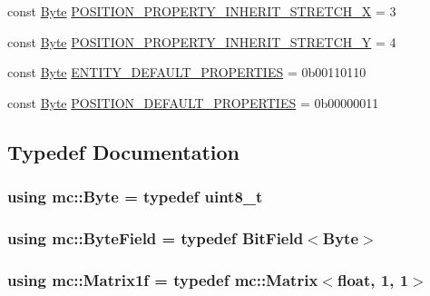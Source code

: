 \begin{DoxyCompactItemize}
\item 
const \hyperlink{namespacemc_a64bc4fa1f43bc4da5c7ac98c04c863e8}{Byte} \hyperlink{namespacemc_a1ddeace50be9bf89c37a08de87213e85}{P\+O\+S\+I\+T\+I\+O\+N\+\_\+\+P\+R\+O\+P\+E\+R\+T\+Y\+\_\+\+I\+N\+H\+E\+R\+I\+T\+\_\+\+S\+T\+R\+E\+T\+C\+H\+\_\+X} = 3
\item 
const \hyperlink{namespacemc_a64bc4fa1f43bc4da5c7ac98c04c863e8}{Byte} \hyperlink{namespacemc_a29d2f6b06f29e315be17e977d9a7eabb}{P\+O\+S\+I\+T\+I\+O\+N\+\_\+\+P\+R\+O\+P\+E\+R\+T\+Y\+\_\+\+I\+N\+H\+E\+R\+I\+T\+\_\+\+S\+T\+R\+E\+T\+C\+H\+\_\+Y} = 4
\item 
const \hyperlink{namespacemc_a64bc4fa1f43bc4da5c7ac98c04c863e8}{Byte} \hyperlink{namespacemc_aad93bda8c11c45721d4d2feb348f9d5f}{E\+N\+T\+I\+T\+Y\+\_\+\+D\+E\+F\+A\+U\+L\+T\+\_\+\+P\+R\+O\+P\+E\+R\+T\+I\+ES} = 0b00110110
\item 
const \hyperlink{namespacemc_a64bc4fa1f43bc4da5c7ac98c04c863e8}{Byte} \hyperlink{namespacemc_a47f82d173aac0c2dab851dfd482fb9d7}{P\+O\+S\+I\+T\+I\+O\+N\+\_\+\+D\+E\+F\+A\+U\+L\+T\+\_\+\+P\+R\+O\+P\+E\+R\+T\+I\+ES} = 0b00000011
\end{DoxyCompactItemize}


\subsection{Typedef Documentation}
\subsubsection[{\texorpdfstring{Byte}{Byte}}]{\setlength{\rightskip}{0pt plus 5cm}using {\bf mc\+::\+Byte} = typedef uint8\+\_\+t}\hypertarget{namespacemc_a64bc4fa1f43bc4da5c7ac98c04c863e8}{}\label{namespacemc_a64bc4fa1f43bc4da5c7ac98c04c863e8}
\subsubsection[{\texorpdfstring{Byte\+Field}{ByteField}}]{\setlength{\rightskip}{0pt plus 5cm}using {\bf mc\+::\+Byte\+Field} = typedef {\bf Bit\+Field}$<${\bf Byte}$>$}\hypertarget{namespacemc_a4ed352b00f84d2c3e9843cf5ea375ca0}{}\label{namespacemc_a4ed352b00f84d2c3e9843cf5ea375ca0}
\subsubsection[{\texorpdfstring{Matrix1f}{Matrix1f}}]{\setlength{\rightskip}{0pt plus 5cm}using {\bf mc\+::\+Matrix1f} = typedef {\bf mc\+::\+Matrix}$<$float, 1, 1$>$}\hypertarget{namespacemc_a6b3e43f58be598160b2a72a45f8da74a}{}\label{namespacemc_a6b3e43f58be598160b2a72a45f8da74a}
